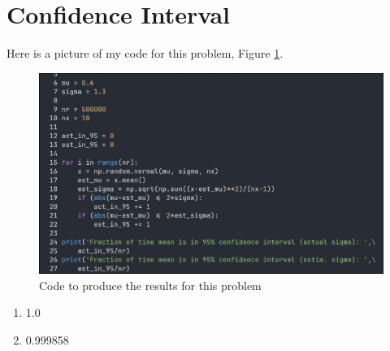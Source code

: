 \documentclass{article}
\begin{document}
\section{Confidence Interval}
    Here is a picture of my code for this problem, Figure \ref{fig:prob6_code}.
    \begin{figure}[t]
        \centering
        \includegraphics[width=\textwidth]{prob6_code.png}
        \caption{Code to produce the results for this problem}
        \label{fig:prob6_code}
    \end{figure}
    \begin{enumerate}[label=\roman*)]
        \item 1.0
        \item 0.999858
    \end{enumerate}
\end{document}
